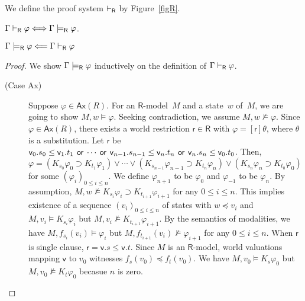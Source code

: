     \begin{definition}
     We define the proof system $\vdash_{\mathsf R}$ by Figure~\ref{figR}.
    \end{definition}

    \begin{theorem}
     \label{sound-comp-nat-kripke}
     $\Gamma\vdash_{\mathsf R}\varphi\Longleftrightarrow\Gamma\models_{\mathsf R} \varphi$\enspace.
    \end{theorem}
    \begin{lemma}[Soundness]
     \label{sound-nat-kripke}
     $\Gamma\models_{\mathsf R}\varphi\Longleftarrow\Gamma\vdash_{\mathsf R}\varphi$
    \end{lemma}
    \begin{proof}
     We show $\Gamma\models_{\mathsf R}\varphi$ inductively
     on the definition of $\Gamma\vdash_{\mathsf R}\varphi$.
     \begin{description}
      \item[(Case {Ax})]
	   Suppose $\varphi\in \mathsf{Ax}(R)$.
	   For an $\mathsf{R}$-model~$M$ and a state~$w$ of~$M$,
	   we are going to show $M,w\models\varphi$.
	   Seeking contradiction,
	   we assume $M,w\not\models\varphi$.
	   Since $\varphi\in\mathsf{Ax}(R)$, there exists a world
	   restriction $\mathsf r\in\mathsf R$ with
	   $\varphi=[\mathsf r]\theta$,
	   where $\theta$ is a substitution.
	   Let $\mathsf r$ be
	   $\mathsf v_0.s_0\le\mathsf v_1.t_1\,\mathbin{\mathsf{or}}\,\cdots\,\mathbin{\mathsf{or}}\,
	   \mathsf v_{n-1}.s_{n-1}\le\mathsf v_n.t_n\,\mathbin{\mathsf{or}}\,\mathsf
	   v_n.s_n\le\mathsf v_0.t_0$.
	   Then,
	   $\varphi = (K_{s_0}\varphi_0\supset
	   K_{t_1}\varphi_1)\vee\cdots\vee
	   (K_{s_{n-1}}\varphi_{n-1}\supset K_{t_n}\varphi_n)
	   \vee (K_{s_n}\varphi_n\supset K_{t_0}\varphi_0)$
	   for some $(\varphi_i)_{0\le i\le n}$.
	   We define $\varphi_{n+1}$ to be $\varphi_0$ and
	   $\varphi_{-1}$ to be $\varphi_n$.
	   By assumption, $M,w\not\models K_{s_i}\varphi_i\supset
	   K_{t_{i+1}}\varphi_{i+1}$ for any $0\le i\le n$.
	   This implies existence of a sequence
	   $(v_i)_{0\le i\le n}$ of states with $w\preceq v_i$ and
	   $M,v_i\models K_{s_i}\varphi_i$ but $M,v_i\not\models
	   K_{t_{i+1}}\varphi_{i+1}$.
	   By the semantics of modalities, we have
	   $M,f_{s_i}(v_i)\models \varphi_i$ but $M,
	   f_{t_{i+1}}(v_i)\not\models\varphi_{i+1}$
	   for any $0\le i\le n$.
	   When $\mathsf r$ is single clause,
	   $\mathsf r = \mathsf v.s\le\mathsf v.t$.
	   Since $M$ is an $\mathsf R$-model, world valuations mapping
	   $\mathsf v$ to $v_0$ witnesses
	   $f_s(v_0)\preceq f_t(v_0)$.
	   We have $M,v_0\models K_s\varphi_0$ but $M,v_0\not\models
	   K_t\varphi_0$ becasue $n$ is zero.

\end{description}
\end{proof}
